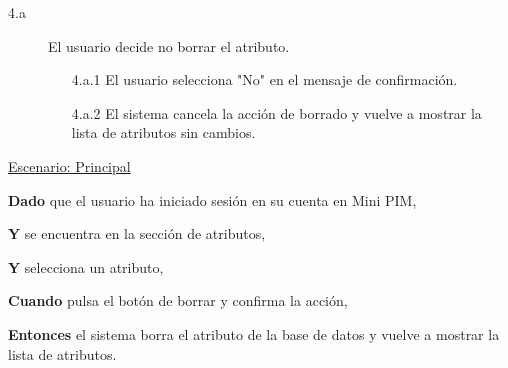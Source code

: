 \begin{description}

    \item[4.a] El usuario decide no borrar el atributo.
    \begin{enumerate}
        \item[4.a.1] El usuario selecciona "No" en el mensaje de confirmación.
        \item[4.a.2] El sistema cancela la acción de borrado y vuelve a mostrar la lista de atributos sin cambios.
    \end{enumerate}

\end{description}

\underline{Escenario: Principal}\par
\vspace{0.15cm}
\textbf{Dado} que el usuario ha iniciado sesión en su cuenta en Mini PIM,\par
\textbf{Y} se encuentra en la sección de atributos,\par
\textbf{Y} selecciona un atributo,\par
\textbf{Cuando} pulsa el botón de borrar y confirma la acción,\par
\textbf{Entonces} el sistema borra el atributo de la base de datos y vuelve a mostrar la lista de atributos.\par
\vspace{0.20cm}

